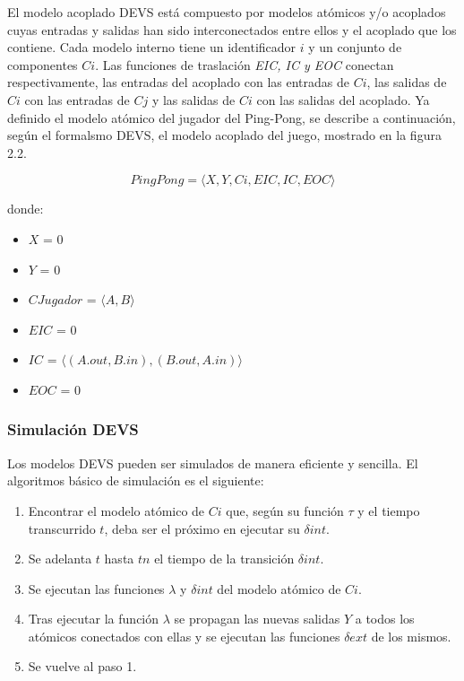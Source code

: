 El modelo acoplado DEVS está compuesto por modelos atómicos y/o acoplados cuyas entradas y salidas han sido interconectados entre ellos y el acoplado que los contiene. Cada modelo interno tiene un identificador $i$ y un conjunto de componentes $C{i}$. Las funciones de traslación \textit{EIC, IC y EOC} conectan respectivamente, las entradas del acoplado con las entradas de $C{i}$, las salidas de $C{i}$ con las entradas de $C{j}$ y las salidas de $C{i}$ con las salidas del acoplado.
Ya definido el modelo atómico del jugador del Ping-Pong, se describe a continuación, según el formalsmo DEVS, el modelo acoplado del juego, mostrado en la figura 2.2.

\begin{equation}\label{eq:DevsPingPong2}
PingPong = \langle X,Y,C{i},EIC,IC,EOC\rangle
\end{equation}

\noindent donde:

\begin{itemize}
\item $X$ = 0
\item $Y$ = 0 
\item $C{Jugador}$ = $\langle A,B\rangle$
\item $EIC$ = 0
\item $IC$ = $\langle (A.out,B.in),(B.out,A.in)\rangle$
\item $EOC$ = 0
\end{itemize}

\subsubsection{Simulación DEVS}
Los modelos DEVS pueden ser simulados de manera eficiente y sencilla. El algoritmos básico de simulación es el siguiente:

\begin{enumerate}
\item Encontrar el modelo atómico de $C{i}$ que, según su función $\tau$ y el tiempo transcurrido $t$, deba ser el próximo en ejecutar su $\delta{int}$.
\item Se adelanta $t$ hasta $t{n}$ el tiempo de la transición $\delta{int}$.
\item Se ejecutan las funciones $\lambda$ y $\delta{int}$ del modelo atómico de $C{i}$.
\item Tras ejecutar la función $\lambda$ se propagan las nuevas salidas $Y$ a todos los atómicos conectados con ellas y se ejecutan las funciones $\delta{ext}$ de los mismos.
\item Se vuelve al paso 1.
\end{enumerate}

